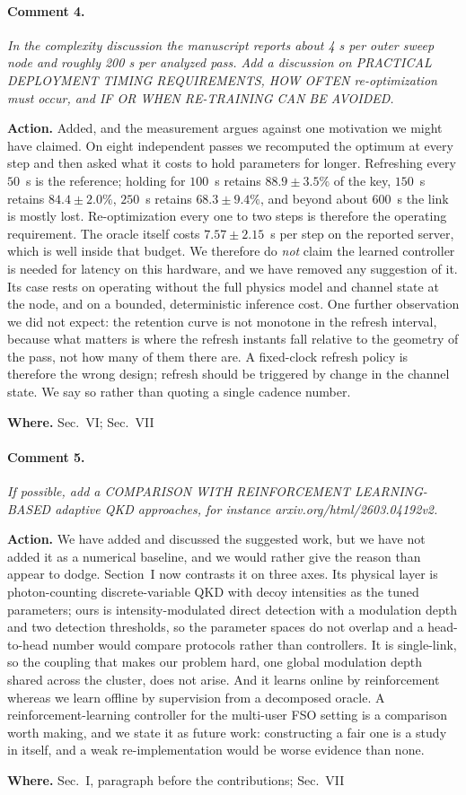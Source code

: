 \documentclass[10pt]{article}
\newcommand{\rev}[1]{\par\medskip\noindent\textit{#1}\par\smallskip}
\newcommand{\act}[2]{\noindent\textbf{Action.} #1\par\noindent\textbf{Where.} #2\par}
\begin{document}
\paragraph{Comment 4.}
\rev{In the complexity discussion the manuscript reports about 4 s per outer sweep node and roughly 200 s per analyzed pass. Add a discussion on PRACTICAL DEPLOYMENT TIMING REQUIREMENTS, HOW OFTEN re-optimization must occur, and IF OR WHEN RE-TRAINING CAN BE AVOIDED.}
\act{Added, and the measurement argues against one motivation we might have claimed. On eight independent passes we recomputed the optimum at every step and then asked what it costs to hold parameters for longer. Refreshing every $50$~s is the reference; holding for $100$~s retains $88.9 \pm 3.5\%$ of the key, $150$~s retains $84.4 \pm 2.0\%$, $250$~s retains $68.3 \pm 9.4\%$, and beyond about $600$~s the link is mostly lost. Re-optimization every one to two steps is therefore the operating requirement. The oracle itself costs $7.57 \pm 2.15$~s per step on the reported server, which is well inside that budget. We therefore do \emph{not} claim the learned controller is needed for latency on this hardware, and we have removed any suggestion of it. Its case rests on operating without the full physics model and channel state at the node, and on a bounded, deterministic inference cost. One further observation we did not expect: the retention curve is not monotone in the refresh interval, because what matters is where the refresh instants fall relative to the geometry of the pass, not how many of them there are. A fixed-clock refresh policy is therefore the wrong design; refresh should be triggered by change in the channel state. We say so rather than quoting a single cadence number.}{Sec.~VI; Sec.~VII}

\paragraph{Comment 5.}
\rev{If possible, add a COMPARISON WITH REINFORCEMENT LEARNING-BASED adaptive QKD approaches, for instance arxiv.org/html/2603.04192v2.}
\act{We have added and discussed the suggested work, but we have not added it as a numerical baseline, and we would rather give the reason than appear to dodge. Section~I now contrasts it on three axes. Its physical layer is photon-counting discrete-variable QKD with decoy intensities as the tuned parameters; ours is intensity-modulated direct detection with a modulation depth and two detection thresholds, so the parameter spaces do not overlap and a head-to-head number would compare protocols rather than controllers. It is single-link, so the coupling that makes our problem hard, one global modulation depth shared across the cluster, does not arise. And it learns online by reinforcement whereas we learn offline by supervision from a decomposed oracle. A reinforcement-learning controller for the multi-user FSO setting is a comparison worth making, and we state it as future work: constructing a fair one is a study in itself, and a weak re-implementation would be worse evidence than none.}{Sec.~I, paragraph before the contributions; Sec.~VII}
\end{document}
